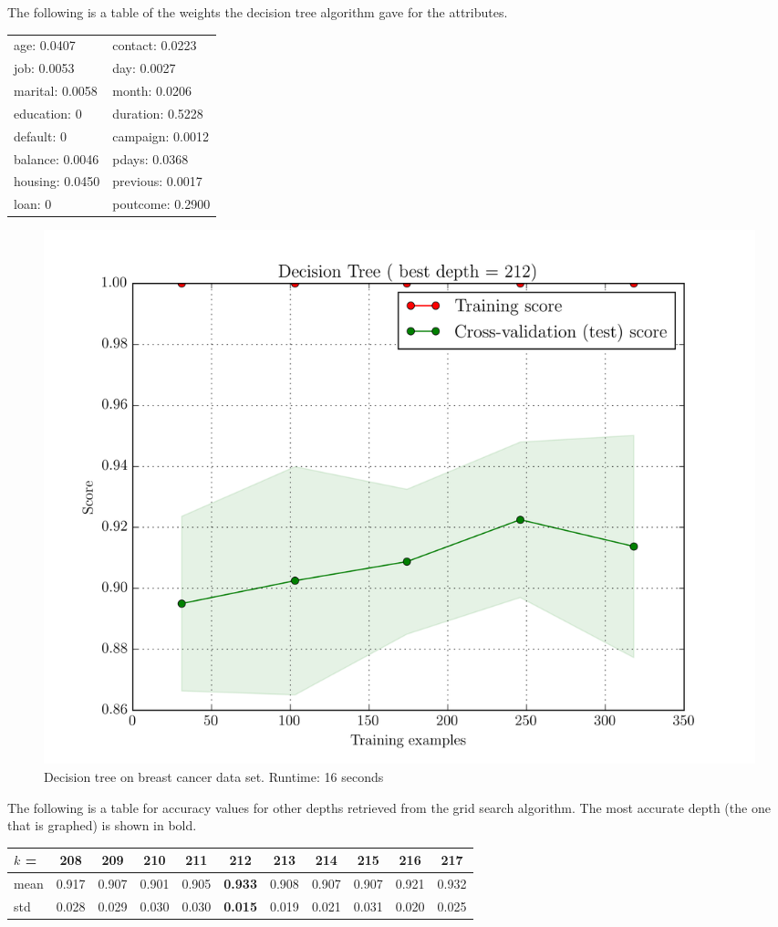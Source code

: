 The following is a table of the weights the decision tree algorithm gave for the attributes.
\begin{center}
    \begin{tabular}{|l|l|}
        \hline
        age:       0.0407 & contact:  0.0223\\
        job:       0.0053 & day:      0.0027\\
        marital:   0.0058 & month:    0.0206\\
        education: 0      & duration: 0.5228\\
        default:   0      & campaign: 0.0012\\
        balance:   0.0046 & pdays:    0.0368\\
        housing:   0.0450 & previous: 0.0017\\
        loan:      0      & poutcome: 0.2900\\
        \hline
    \end{tabular}
\end{center}

\begin{figure}[H]
    \centering
    \includegraphics[width=.7\textwidth]{breast/tree.png}
    \caption{Decision tree on breast cancer data set. Runtime: 16 seconds}
\end{figure}

The following is a table for accuracy values for other depths retrieved from the grid search algorithm.
The most accurate depth (the one that is graphed) is shown in bold.
\begin{center}
    \begin{tabular}{l|| c | c | c | c | c | c | c | c | c | c}
        $k$ = & 208   & 209   & 210   & 211   & \textbf{212}   & 213   & 214   & 215   & 216   & 217\\
         \hline
         mean & 0.917 & 0.907 & 0.901 & 0.905 & \textbf{0.933} & 0.908 & 0.907 & 0.907 & 0.921 & 0.932\\
         std  & 0.028 & 0.029 & 0.030 & 0.030 & \textbf{0.015} & 0.019 & 0.021 & 0.031 & 0.020 & 0.025
    \end{tabular}
\end{center}

